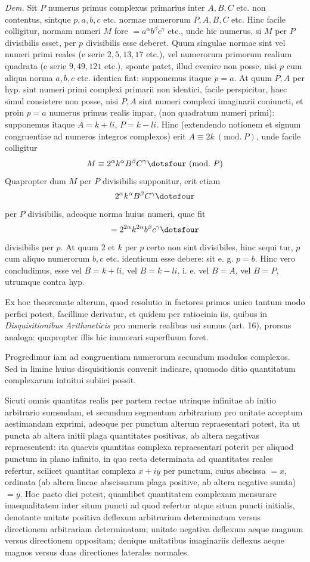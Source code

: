 \emph{Dem.} Sit $P$ numerus primus complexus primarius inter $A,B,C$ etc. non contentus, sintque $p,a,b,c$ etc. normae numerorum $P,A,B,C$ etc. Hinc facile colligitur, normam numeri $M$ fore $=a^\alpha b^\beta c^\gamma$ etc., unde hic numerus, si $M$ per $P$ divisibilis esset, per $p$ divisibilis esse deberet. Quum singulae normae sint vel numeri primi reales (e serie $2,5,13,17$ etc.), vel numerorum primorum realium quadrata (e serie $9,49,121$ etc.), sponte patet, illud evenire non posse, nisi $p$ cum aliqua norma $a,b,c$ etc. identica fiat: supponemus itaque $p=a$. At quum $P,A$ per hyp. sint numeri primi complexi primarii non identici, facile perspicitur, haec simul consistere non posse, nisi $P,A$ sint numeri complexi imaginarii coniuncti, et proin $p=a$ numerus primus realis impar, (non quadratum numeri primi): supponemus itaque $A=k+li$, $P=k-li$. Hinc (extendendo notionem et signum congruentiae ad numeros integros complexos) erit $A\equiv2k\ (\mathrm{mod.}\ P)$, unde facile colligitur
\[
M\equiv2^\alpha k^\alpha B^\beta C^\gamma\dotsfour\ (\mathrm{mod.}\ P)
\]
Quapropter dum $M$ per $P$ divisibilis supponitur, erit etiam
\[
2^\alpha k^\alpha B^\beta C^\gamma\dotsfour
\]
per $P$ divisibilis, adeoque norma huius numeri, quae fit
\[
=2^{2\alpha}k^{2\alpha}b^\beta c^\gamma\dotsfour
\]
divisibilis per $p$. At quum $2$ et $k$ per $p$ certo non sint divisibiles, hinc sequi%
%
tur, $p$ cum aliquo numerorum $b,c$ etc. identicum esse debere: sit e. g. $p=b$. Hinc vero concludimus, esse vel $B=k+li$, vel $B=k-li$, i. e. vel $B=A$, vel $B=P$, utrumque contra hyp.

Ex hoc theoremate alterum, quod resolutio in factores primos unico tantum modo perfici potest, facillime derivatur, et quidem per ratiocinia iis, quibus in \emph{Disquisitionibus Arithmeticis} pro numeris realibus usi sumus (art. 16), prorsus analoga: quapropter illis hic immorari superfluum foret.

Progredimur iam ad congruentiam numerorum secundum modulos complexos. Sed in limine huius disquisitionis convenit indicare, quomodo ditio quantitatum complexarum intuitui subiici possit.

Sicuti omnis quantitas realis per partem rectae utrinque infinitae ab initio arbitrario sumendam, et secundum segmentum arbitrarium pro unitate acceptum aestimandam exprimi, adeoque per punctum alterum repraesentari potest, ita ut puncta ab altera initii plaga quantitates positivas, ab altera negativas repraesentent: ita quaevis quantitas complexa repraesentari poterit per aliquod punctum in plano infinito, in quo recta determinata ad quantitates reales refertur, scilicet quantitas complexa $x+iy$ per punctum, cuius abscissa $=x$, ordinata (ab altera lineae abscissarum plaga positive, ab altera negative sumta) $=y$. Hoc pacto dici potest, quamlibet quantitatem complexam mensurare inaequalitatem inter situm puncti ad quod refertur atque situm puncti initialis, denotante unitate positiva deflexum arbitrarium determinatum versus directionem arbitrariam determinatam; unitate negativa deflexum aeque magnum versus directionem oppositam; denique unitatibus imaginariis deflexus aeque magnos versus duas directiones laterales normales.

